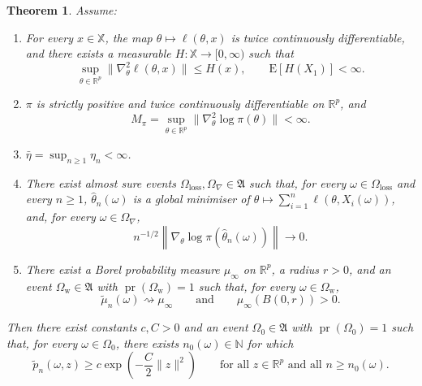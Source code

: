 \documentclass[10pt,a4paper]{amsart}
\newtheorem{thm}{Theorem}
\renewcommand{\Pr}{\operatorname{pr}}
\begin{document}
\begin{thm} \label{thm:gp-envelope} Assume:
\begin{enumerate}
\item[$\mathrm{(C1)}$] For every $x\in\mathbb{X}$, the map $\theta\mapsto\ell(\theta,x)$
is twice continuously differentiable, and there exists a measurable
$H:\mathbb{X}\to[0,\infty)$ such that
\[
\sup_{\theta\in\mathbb{R}^{p}}\|\nabla_{\theta}^{2}\ell(\theta,x)\|\le H(x),\qquad\mathrm{E}[H(X_{1})]<\infty.
\]
\item[$\mathrm{(C2)}$] $\pi$ is strictly positive and twice continuously differentiable
on $\mathbb{R}^{p}$, and
\[
M_{\pi}=\sup_{\theta\in\mathbb{R}^{p}}\|\nabla_{\theta}^{2}\log\pi(\theta)\|<\infty.
\]
\item[$\mathrm{(C3)}$] $\bar{\eta}=\sup_{n\ge1}\eta_{n}<\infty$.
\item[$\mathrm{(C4)}$] There exist almost sure events $\Omega_{\mathrm{loss}},\Omega_{\nabla}\in\mathfrak{A}$
such that, for every $\omega\in\Omega_{\mathrm{loss}}$ and every
$n\ge1$, $\hat{\theta}_{n}(\omega)$ is a global minimiser of $\theta\mapsto\sum_{i=1}^{n}\ell(\theta,X_{i}(\omega))$,
and, for every $\omega\in\Omega_{\nabla}$,
\[
n^{-1/2}\left\|\nabla_{\theta}\log\pi\left(\hat{\theta}_{n}(\omega)\right)\right\|\to0.
\]
\item[$\mathrm{(C5)}$] There exist a Borel probability measure $\mu_{\infty}$ on $\mathbb{R}^{p}$,
a radius $r>0$, and an event $\Omega_{\mathrm{w}}\in\mathfrak{A}$
with $\Pr(\Omega_{\mathrm{w}})=1$ such that, for every $\omega\in\Omega_{\mathrm{w}}$,
\[
\tilde\mu_n(\omega)\rightsquigarrow\mu_{\infty}\qquad\text{and}\qquad\mu_{\infty}(B(0,r))>0.
\]
\end{enumerate}
Then there exist constants $c,C>0$ and an event $\Omega_{0}\in\mathfrak{A}$
with $\Pr(\Omega_{0})=1$ such that, for every $\omega\in\Omega_{0}$,
there exists $n_{0}(\omega)\in\mathbb{N}$ for which
\begin{equation}
\tilde p_{n}(\omega,z)\ge c\exp\left(-\frac{C}{2}\|z\|^{2}\right)\qquad\text{for all }z\in\mathbb{R}^{p}\text{ and all }n\ge n_{0}(\omega).\label{eq:Gen_Bayes_Lower_bound}
\end{equation}
\end{thm}
\end{document}
